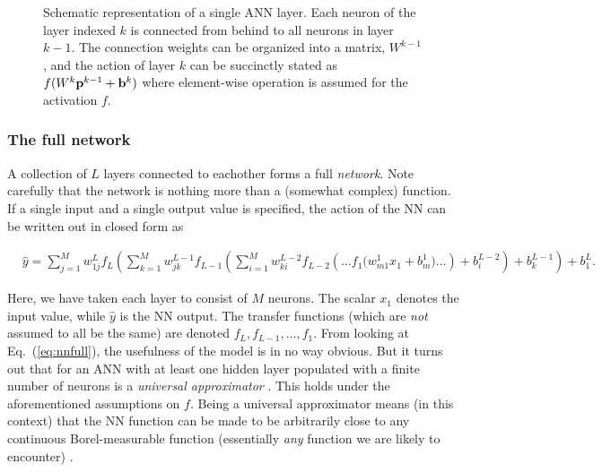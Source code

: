 \documentclass[a4paper, twocolumn]{article}
\newcommand{\eq} [1]{Eq.\ (\ref{eq:#1})}
\begin{document}
\begin{figure}
\begin{centering}
\end{centering}
\caption{Schematic representation of a single ANN layer. Each neuron of the layer indexed $k$ is connected from behind to all neurons in layer $k-1$. The connection weights can be organized into a matrix, $W^{k-1}$, and the action of layer $k$ can be succinctly stated as $f(W^{k}{\bf p}^{k-1}+{\bf b}^k)$ where element-wise operation is assumed for the activation $f$. \label{fig:layer}}
\end{figure}

\subsubsection{The full network}
A collection of $L$ layers connected to eachother forms a full \emph{network}. Note carefully that the network is nothing more than a (somewhat complex) function. If a single input and a single output value is specified, the action of the NN can be written out in closed form as 
\begin{strip}
\begin{align}
&\hat y\! = \!\left.\!\sum_{j=1}^{M}\! w_{1j}^L f_L\!\left(\!\sum_{k=1}^{M}\! w_{jk}^{L-1} f_{L-1}\!\left(\!
\sum_{i=1}^Mw_{ki}^{L-2} f_{L-2}\left( \dots f_1\!\Big(\!w_{m1}^1 x_1 \! + \!b_m^1\!\Big)
 \!\dots \!\right)+ b_i^{L-2}\right) \!+ \!b_k^{L-1}\!\right)
 \!+ \!b_1^L\!\right.. \label{eq:nnfull}
\end{align}
\end{strip}
Here, we have taken each layer to consist of $M$ neurons. The scalar $x_1$ denotes the input value, while $\hat y$ is the NN output. The transfer functions (which are \textit{not} assumed to all be the same) are denoted $f_L, f_{L-1},\dots,f_1$. From looking at \eq{nnfull}, the usefulness of the model is in no way obvious. But it turns out that for an ANN with at least one hidden layer populated with a finite number of neurons is a \emph{universal approximator} \autocite{HORNIK1989359}. This holds under the aforementioned assumptions on $f$. Being a universal approximator means (in this context) that the NN function can be made to be arbitrarily close to any continuous Borel-measurable function (essentially \emph{any} function we are likely to encounter) \autocite{mcdonald}. 
\end{document}
